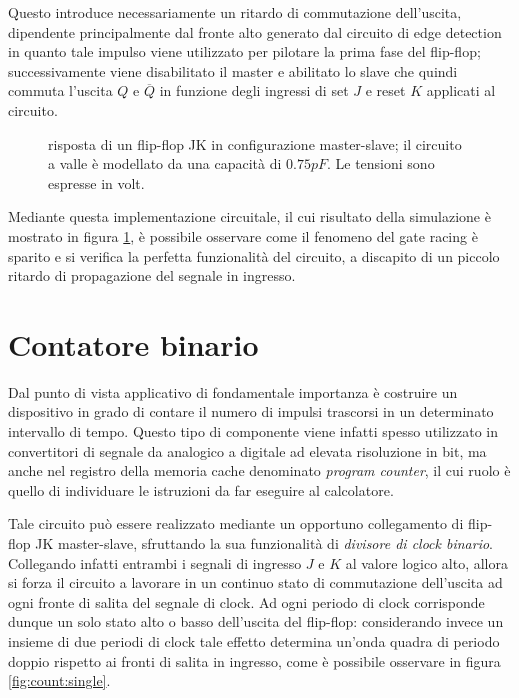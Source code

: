 	Questo introduce necessariamente un ritardo di commutazione dell'uscita, dipendente principalmente dal fronte alto generato dal circuito di edge detection in quanto tale impulso viene utilizzato per pilotare la prima fase del flip-flop; successivamente viene disabilitato il master e abilitato lo slave che quindi commuta l'uscita $Q$ e $\overline Q$ in funzione degli ingressi di set $J$ e reset $K$ applicati al circuito.
	
	
	\begin{figure}[bht]
		\centering
		
		\caption{risposta di un flip-flop JK in configurazione master-slave; il circuito a valle è modellato da una capacità di $0.75pF$. Le tensioni sono espresse in volt.}
		\label{fig:jkff:sim-masterslave}
	\end{figure}
	
	Mediante questa implementazione circuitale, il cui risultato della simulazione è mostrato in figura \ref{fig:jkff:sim-masterslave}, è possibile osservare come il fenomeno del gate racing è sparito e si verifica la perfetta funzionalità del circuito, a discapito di un piccolo ritardo di propagazione del segnale in ingresso.
	
\section{Contatore binario}
	Dal punto di vista applicativo di fondamentale importanza è costruire un dispositivo in grado di contare il numero di impulsi trascorsi in un determinato intervallo di tempo. Questo tipo di componente viene infatti spesso utilizzato in convertitori di segnale da analogico a digitale ad elevata risoluzione in bit, ma anche nel registro della memoria cache denominato \textit{program counter}, il cui ruolo è quello di individuare le istruzioni da far eseguire al calcolatore.
	
	Tale circuito può essere realizzato mediante un opportuno collegamento di flip-flop JK master-slave, sfruttando la sua funzionalità di \textit{divisore di clock binario}. Collegando infatti entrambi i segnali di ingresso $J$ e $K$ al valore logico alto, allora si forza il circuito a lavorare in un continuo stato di commutazione dell'uscita ad ogni fronte di salita del segnale di clock. Ad ogni periodo di clock corrisponde dunque un solo stato alto o basso dell'uscita del flip-flop: considerando invece un insieme di due periodi di clock tale effetto determina un'onda quadra di periodo doppio rispetto ai fronti di salita in ingresso, come è possibile osservare in figura \ref{fig:count:single}.
	
